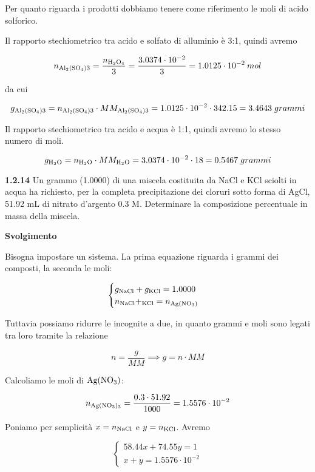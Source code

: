 Per quanto riguarda i prodotti dobbiamo tenere come riferimento le moli di acido solforico.

Il rapporto stechiometrico tra acido e solfato di alluminio è 3:1, quindi avremo

$$n_{\rm Al_2(SO_4)3}=\frac{n_{\rm H_2O_4}}{3}
=\frac{3.0374 \cdot 10^{-2}}{3}
=1.0125 \cdot 10^{-2}\:mol$$

da cui

$$g_{\rm Al_2(SO_4)3}=n_{\rm Al_2(SO_4)3} \cdot MM_{\rm Al_2(SO_4)3}
=1.0125 \cdot 10^{-2} \cdot 342.15
=3.4643\;grammi$$

Il rapporto stechiometrico tra acido e acqua è 1:1, quindi avremo lo stesso numero di moli.

$$g_{\rm H_2O}=n_{\rm H_2O} \cdot MM_{\rm H_2O}
=3.0374 \cdot 10^{-2} \cdot 18
=0.5467\;grammi$$

\vspace{0.2cm}\textbf{1.2.14} Un grammo (1.0000) di una miscela costituita da NaCl e KCl sciolti in acqua ha richiesto, per la completa precipitazione dei cloruri sotto forma di AgCl, 51.92 mL di nitrato d'argento 0.3 M. Determinare la composizione percentuale in massa della miscela.

\vspace{0.2cm}\large\textbf{Svolgimento}\normalsize

\vspace{0.2cm}Bisogna impostare un sistema. La prima equazione riguarda i grammi dei composti, la seconda le moli:

$$\begin{cases}
    g_{\rm NaCl} + g_{\rm KCl}=1.0000\\
    n_{\rm NaCl} + _{\rm KCl}=n_{\rm Ag(NO_3)}
\end{cases}$$

Tuttavia possiamo ridurre le incognite a due, in quanto grammi e moli sono legati tra loro tramite la relazione

$$n=\frac{g}{MM}
\implies
g=n \cdot MM$$

Calcoliamo le moli di $\rm Ag(NO_3)$:

$$n_{\rm Ag(NO_3)_3}=\frac{0.3 \cdot 51.92}{1000}=1.5576 \cdot 10^{-2}$$

Poniamo per semplicità $x=n_{\rm NaCl}$ e $y=n_{\rm KCl}$. Avremo

$$\begin{cases}
    58.44x + 74.55y=1\\
    x+y=1.5576 \cdot 10^{-2}
\end{cases}$$

